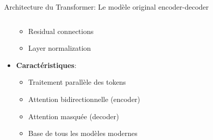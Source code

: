 \documentclass[aspectratio=169]{beamer}
\begin{document}
\begin{frame}{Architecture du Transformer: Le modèle original encoder-decoder}
\begin{columns}
\begin{column}{0.5\textwidth}
\begin{itemize}
\begin{itemize}
                    \item Residual connections
                    \item Layer normalization
                \end{itemize}
                \vspace{0.2cm}
                \item \textbf{Caractéristiques}:
                \begin{itemize}
                    \item Traitement parallèle des tokens
                    \item Attention bidirectionnelle (encoder)
                    \item Attention masquée (decoder)
                    \item Base de tous les modèles modernes
                \end{itemize}
            \end{itemize}
        \end{column}
    \end{columns}
\end{frame}
\end{document}
